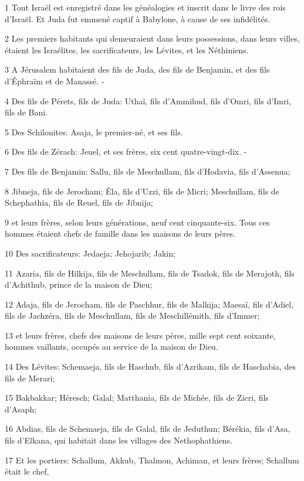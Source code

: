 \par 1 Tout Israël est enregistré dans les généalogies et inscrit dans le livre des rois d'Israël. Et Juda fut emmené captif à Babylone, à cause de ses infidélités.
\par 2 Les premiers habitants qui demeuraient dans leurs possessions, dans leurs villes, étaient les Israélites, les sacrificateurs, les Lévites, et les Néthiniens.
\par 3 A Jérusalem habitaient des fils de Juda, des fils de Benjamin, et des fils d'Éphraïm et de Manassé. -
\par 4 Des fils de Pérets, fils de Juda: Uthaï, fils d'Ammihud, fils d'Omri, fils d'Imri, fils de Bani.
\par 5 Des Schilonites: Asaja, le premier-né, et ses fils.
\par 6 Des fils de Zérach: Jeuel, et ses frères, six cent quatre-vingt-dix. -
\par 7 Des fils de Benjamin: Sallu, fils de Meschullam, fils d'Hodavia, fils d'Assenua;
\par 8 Jibneja, fils de Jerocham; Éla, fils d'Uzzi, fils de Micri; Meschullam, fils de Schephathia, fils de Reuel, fils de Jibnija;
\par 9 et leurs frères, selon leurs générations, neuf cent cinquante-six. Tous ces hommes étaient chefs de famille dans les maisons de leurs pères.
\par 10 Des sacrificateurs: Jedaeja; Jehojarib; Jakin;
\par 11 Azaria, fils de Hilkija, fils de Meschullam, fils de Tsadok, fils de Merajoth, fils d'Achithub, prince de la maison de Dieu;
\par 12 Adaja, fils de Jerocham, fils de Paschhur, fils de Malkija; Maesaï, fils d'Adiel, fils de Jachzéra, fils de Meschullam, fils de Meschillémith, fils d'Immer;
\par 13 et leurs frères, chefs des maisons de leurs pères, mille sept cent soixante, hommes vaillants, occupés au service de la maison de Dieu.
\par 14 Des Lévites: Schemaeja, fils de Haschub, fils d'Azrikam, fils de Haschabia, des fils de Merari;
\par 15 Bakbakkar; Héresch; Galal; Matthania, fils de Michée, fils de Zicri, fils d'Asaph;
\par 16 Abdias, fils de Schemaeja, fils de Galal, fils de Jeduthun; Bérékia, fils d'Asa, fils d'Elkana, qui habitait dans les villages des Nethophathiens.
\par 17 Et les portiers: Schallum, Akkub, Thalmon, Achiman, et leurs frères; Schallum était le chef,
